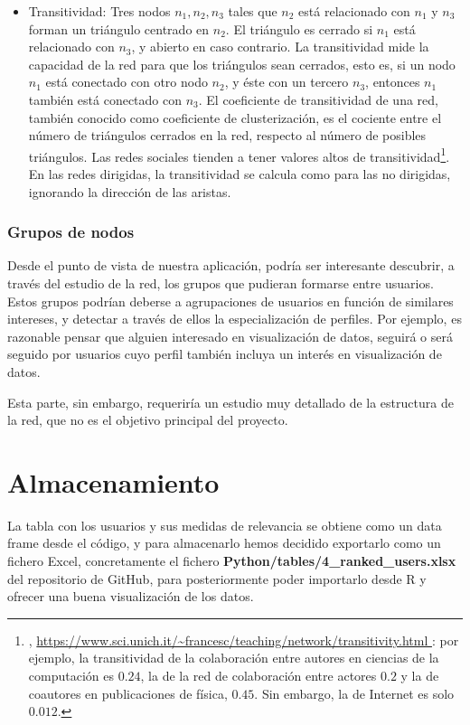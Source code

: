 \begin{itemize}
\item Transitividad: Tres nodos $n_1, n_2, n_3$ tales que $n_2$ está relacionado con $n_1$ y $n_3$ forman un triángulo centrado en $n_2$.
El triángulo es cerrado si $n_1$ está relacionado con $n_3$, y abierto en caso contrario. La
transitividad mide la capacidad de la red para que los triángulos sean cerrados, esto es,
si un nodo $n_1$ está conectado
con otro nodo $n_2$, y éste con un tercero $n_3$, entonces $n_1$ también está conectado
con $n_3$.  
El coeficiente de transitividad de una red, también conocido
como coeficiente de clusterización, es el cociente entre el número de triángulos 
cerrados en la red, respecto al número de posibles triángulos. Las redes sociales
tienden a tener valores altos de transitividad\footnote{\cite{notas_fernando}, \url{https://www.sci.unich.it/~francesc/teaching/network/transitivity.html }:
por ejemplo, la transitividad de la colaboración entre autores en ciencias
de la computación es $0.24$, la de la red de colaboración entre actores
$0.2$ y la de coautores en publicaciones de física, $0.45$. Sin embargo,
la de Internet es solo $0.012$.}.
En las redes dirigidas, la transitividad se calcula como para las no dirigidas,
ignorando la dirección de las aristas.
\end{itemize}


\subsubsection{Grupos de nodos}
Desde el punto de vista de nuestra aplicación, podría ser interesante
descubrir, a través del estudio de la red, los grupos que pudieran formarse
entre usuarios. Estos grupos podrían deberse a agrupaciones de usuarios en
función de similares intereses, y detectar a través de ellos la especialización
de perfiles. Por ejemplo, es razonable pensar que alguien interesado en visualización
de datos, seguirá o será seguido por usuarios cuyo perfil también incluya un
interés en visualización de datos. 

Esta parte, sin embargo, requeriría un estudio muy detallado de la estructura
de la red, que no es el objetivo principal del proyecto.

\section{Almacenamiento}
La tabla con los usuarios y sus medidas de relevancia se obtiene como un data frame
desde el código, y para almacenarlo hemos decidido exportarlo como un fichero Excel,
concretamente el fichero {\bf Python/tables/4\_ranked\_users.xlsx} del 
repositorio de GitHub, para posteriormente poder importarlo desde R y ofrecer
una buena visualización de los datos.

